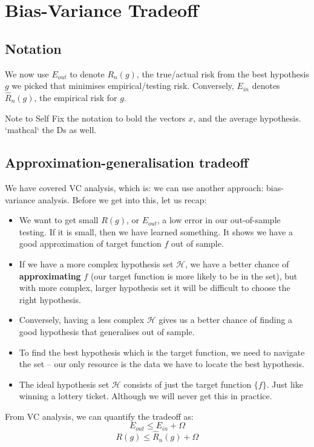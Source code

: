 \section{Bias-Variance Tradeoff}
\subsection{Notation}
We now use $E_{out}$ to denote $R_n(g)$, the true/actual risk from the best hypothesis $g$ we picked that minimises empirical/testing risk. Conversely, $E_{in}$ denotes $\widehat{R}_n(g)$, the empirical risk for $g$. \\

\begin{commentbox}{Note to Self}
    Fix the notation to bold the vectors $x$, and the average hypothesis. `mathcal` the Ds as well.
\end{commentbox}



\subsection{Approximation-generalisation tradeoff}
We have covered VC analysis, which is: we can use another approach: bias-variance analysis. Before we get into this, let us recap:
\begin{itemize}
    \item We want to get small $R(g)$, or $E_{out}$, a low error in our out-of-sample testing. If it is small, then we have learned something. It shows we have a good approximation of target function $f$ out of sample.
    \item If we have a more complex hypothesis set $\mathcal{H}$, we have a better chance of \textbf{approximating} $f$ (our target function is more likely to be in the set), but with more complex, larger hypothesis set it will be difficult to choose the right hypothesis.
    \item Conversely, having a less complex $\mathcal{H}$ gives us a better chance of finding a good hypothesis that generalises out of sample.
    \item To find the best hypothesis which is the target function, we need to navigate the set – our only resource is the data we have to locate the best hypothesis. 
    \item The ideal hypothesis set $\mathcal{H}$ consists of just the target function $\{f\}$. Just like winning a lottery ticket. Although we will never get this in practice.




\end{itemize}
    From VC analysis, we can quantify the tradeoff as:
    \[E_{out} \leq E_{in} + \Omega\]
    \[R(g) \leq \widehat{R}_n(g) + \Omega\]

